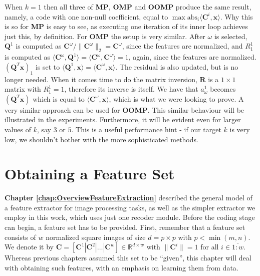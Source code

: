 \documentclass[12pt,a4paper,oneside,english]{UPBThesis}
\newcommand{\hctimes}[2]{{#1}\!\times\!{#2}}
\newcommand{\hcrange}[2]{\overline{{#1}\colon\!\!{#2}}}
\begin{document}
When $k=1$ then all three of \textbf{MP}, \textbf{OMP} and \textbf{OOMP} produce the same result, namely, a code with one non-null coefficient, equal to $\max\mbox{abs}_i {\langle \textbf{C}^i, \textbf{x} \rangle }$. Why this is so for \textbf{MP} is easy to see, as executing one iteration of its inner loop achieves just this, by definition. For \textbf{OMP} the setup is very similar. After $\omega$ is selected, $\textbf{Q}^1$ is computed as $\textbf{C}^\omega / \| \textbf{C}^\omega \|_2 = \textbf{C}^\omega$, since the features are normalized, and $R_1^1$ is computed as $\langle \textbf{C}^\omega, \textbf{Q}^1 \rangle = \langle \textbf{C}^\omega, \textbf{C}^\omega \rangle = 1$, again, since the features are normalized. $(\textbf{Q}^T\textbf{x})_1$ is set to $\langle \textbf{Q}^1, \textbf{x} \rangle = \langle \textbf{C}^\omega, \textbf{x} \rangle$. The residual is also updated, but is no longer needed. When it comes time to do the matrix inversion, $\textbf{R}$ is a $\hctimes{1}{1}$ matrix with $R_1^1 = 1$, therefore its inverse is itself. We have that $a_\omega^1$ becomes $(\textbf{Q}^T\textbf{x})$ which is equal to $\langle \textbf{C}^\omega, \textbf{x} \rangle$, which is what we were looking to prove. A very similar approach can be used for \textbf{OOMP}. This similar behaviour will be illustrated in the experiments. Furthermore, it will be evident even for larger values of $k$, say $3$ or $5$. This is a useful performance hint - if our target $k$ is very low, we shouldn't bother with the more sophisticated methods.

\chapter{Obtaining a Feature Set}
\label{chap:ObtainingFeatureSet}

\textbf{Chapter \ref{chap:OverviewFeatureExtraction}} described the general model of a feature extractor for image processing tasks, as well as the simpler extractor we employ in this work, which uses just one recoder module. Before the coding stage can begin, a feature set has to be provided. First, remember that a feature set consists of $w$ normalized square images of size $d = \hctimes{p}{p}$ with $p < \min(m,n)$. We denote it by $\textbf{C} = \left[ \textbf{C}^1 \left|\right. \textbf{C}^2 \left|\right. \dots \left|\right. \textbf{C}^w \right] \in \mathbb{R}^{\hctimes{d}{w}}$ with $\|\mathbf{C}^i\| = 1$ for all $i \in \hcrange{1}{w}$. Whereas previous chapters assumed this set to be ``given'', this chapter will deal with obtaining such features, with an emphasis on learning them from data.
\end{document}
